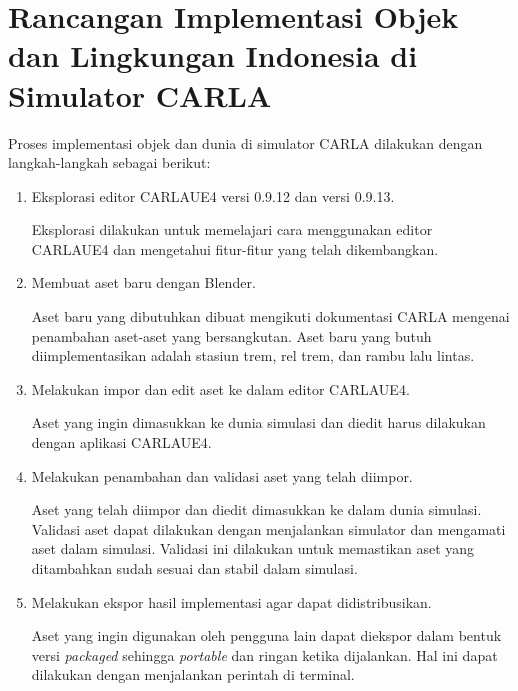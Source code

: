 \section{Rancangan Implementasi Objek dan Lingkungan Indonesia di Simulator CARLA}

Proses implementasi objek dan dunia di simulator CARLA dilakukan dengan
langkah-langkah sebagai berikut:

\begin{enumerate}

	\item Eksplorasi editor CARLAUE4 versi 0.9.12 dan versi 0.9.13.

	Eksplorasi dilakukan untuk memelajari cara menggunakan editor CARLAUE4 dan
	mengetahui fitur-fitur yang telah dikembangkan.

	\item Membuat aset baru dengan Blender.

	Aset baru yang dibutuhkan dibuat mengikuti dokumentasi CARLA mengenai
	penambahan aset-aset yang bersangkutan. Aset baru yang butuh
	diimplementasikan adalah stasiun trem, rel trem, dan rambu lalu lintas.

	\item Melakukan impor dan edit aset ke dalam editor CARLAUE4.

	Aset yang ingin dimasukkan ke dunia simulasi dan diedit harus dilakukan
	dengan aplikasi CARLAUE4.




	\item Melakukan penambahan dan validasi aset yang telah diimpor.

	Aset yang telah diimpor dan diedit dimasukkan ke dalam dunia simulasi.
	Validasi aset dapat dilakukan dengan menjalankan simulator dan mengamati
	aset dalam simulasi. Validasi ini dilakukan untuk memastikan aset yang
	ditambahkan sudah sesuai dan stabil dalam simulasi.

	\item Melakukan ekspor hasil implementasi agar dapat didistribusikan.

	Aset yang ingin digunakan oleh pengguna lain dapat diekspor dalam bentuk
	versi \textit{packaged} sehingga \textit{portable} dan ringan ketika
	dijalankan. Hal ini dapat dilakukan dengan menjalankan perintah di terminal.

\end{enumerate}
